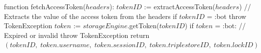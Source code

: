function fetchAccessToken($headers$):
    $tokenID$ := extractAccessToken($headers$) // Extracts the value of the access token from the headers
    if $tokenID$ = :bot
        throw TokenException
    $token$ := $storageEngine$.getToken($tokenID$)
    if $token$ = :bot: // Expired or invalid
        throw TokenException
    return $(tokenID, \; token.username, \; token.sessionID, \; token.triplestoreID, \; token.lockID)$